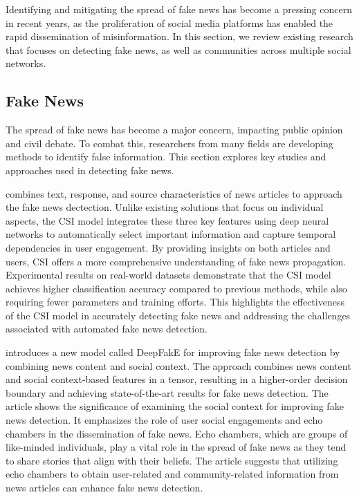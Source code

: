 \documentclass[12pt]{article}
\begin{document}
Identifying and mitigating the spread of fake news has become a pressing concern in recent years,
as the proliferation of social media platforms has enabled the rapid dissemination of 
misinformation. 
In this section, we review existing research that focuses on detecting fake news, 
as well as  communities across multiple social networks. 

\subsection{Fake News}

The spread of fake news has become a major concern, impacting public opinion and civil debate. 
To combat this, researchers from many fields are developing methods to identify false information. 
This section explores key studies and approaches used in detecting fake news.

\cite{Ruchansky_2017} combines text, response, and source characteristics of news articles to approach
the fake news dectection.
Unlike existing solutions that focus on individual aspects, the CSI model integrates these three 
key features using deep neural networks to automatically select important information and capture 
temporal dependencies in user engagement. By providing insights on both articles and users, 
CSI offers a more comprehensive understanding of fake news propagation. Experimental results on 
real-world datasets demonstrate that the CSI model achieves higher classification accuracy compared 
to previous methods, while also requiring fewer parameters and training efforts. 
This highlights the effectiveness of the CSI model in accurately detecting fake 
news and addressing the challenges associated with automated fake news detection.

\cite{DeepFakE} introduces a new model called DeepFakE for improving fake news detection by combining news content and social context. 
The approach combines news content and social context-based features in a tensor, 
resulting in a higher-order decision boundary and achieving state-of-the-art results for fake news detection.
The article shows the significance of examining the social context for improving fake news detection. 
It emphasizes the role of user social engagements and echo chambers in the dissemination of fake news. 
Echo chambers, which are groups of like-minded individuals, play a vital role in the spread of fake news as 
they tend to share stories that align with their beliefs. 
The article suggests that utilizing echo chambers to obtain user-related and community-related 
information from news articles can enhance fake news detection. 
\end{document}
